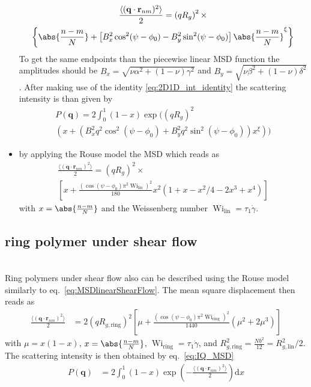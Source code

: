 \begin{itemize}
\begin{multline}
    \frac{\langle(\mathbf{q}\cdot\mathbf{r}_{nm})^2\rangle}{2} =\left(qR_g\right)^2 \times \\
    \left\{
      \abs{\frac{n-m}{N}} + \left[B_x^2\cos^2(\psi-\phi_0)-B_y^2\sin^2(\psi-\phi_0)\right]\abs{\frac{n-m}{N}}^\xi
    \right\}
    \end{multline}
    To get the same endpoints than the piecewise linear MSD function the amplitudes should be $B_x=\sqrt{\nu\alpha^2+(1-\nu)\gamma^2}$ and $B_y=\sqrt{\nu\beta^2+(1-\nu)\delta^2}$.
    After making use of the identity \ref{eq:2D1D_int_identity} the scattering intensity is than given by
    \begin{multline}
      P(\mathbf{q}) = 2 \int_0^1 (1-x) \exp\Bigg( \left(qR_g\right)^2\\
      \left(
      x + \left(B_x^2q^2\cos^2(\psi-\phi_0)+B_y^2q^2\sin^2(\psi-\phi_0)\right)x^\xi
      \right)\Bigg)
    \end{multline}
\item by applying the Rouse model \cite{Korolkovas2019} the MSD which reads as
    \begin{multline}\label{eq:MSDlinearShearFlow}
    \frac{\langle(\mathbf{q}\cdot\mathbf{r}_{nm})^2\rangle}{2} = \left(qR_g\right)^2 \times \\ \left[ x+\frac{\left(\cos(\psi-\phi_0)\pi^2\operatorname{Wi}_\mathrm{lin}\right)^2}{180} x^2\left(1+x-x^2/4-2x^3+x^4\right) \right]
    \end{multline}
    with $x=\abs{\frac{n-m}{N}}$ and the Weissenberg number $\operatorname{Wi}_\mathrm{lin}=\tau_1\dot{\gamma}$.
\end{itemize}

\subsection{ring polymer under shear flow}~\\
Ring polymers under shear flow also can be described using the Rouse model \cite{Tsolou2010,Stephanou2019} similarly to eq.\ \ref{eq:MSDlinearShearFlow}. The mean square displacement then reads as
\begin{align}\label{eq:MSDringShearFlow}
\frac{\langle(\mathbf{q}\cdot\mathbf{r}_{nm})^2\rangle}{2} &= 2\left(qR_{g,\mathrm{ring}}\right)^2
\left[ \mu+\frac{\left(\cos(\psi-\phi_0)\pi^2\operatorname{Wi}_\mathrm{ring}\right)^2}{1440} \left(\mu^2+2\mu^3\right) \right]
\end{align}
with $\mu=x(1-x)$, $x=\abs{\frac{n-m}{N}}$, $\operatorname{Wi}_\mathrm{ring}=\tau_1\dot{\gamma}$, and $R_{g,\mathrm{ring}}^2=\frac{Nb^2}{12}=R_{g,\mathrm{lin}}^2/2$. The scattering intensity is then obtained by eq.\ \ref{eq:IQ_MSD}
\begin{align}
 P(\mathbf{q}) & = 2\int_0^1 (1-x) \exp\left(-\frac{\langle(\mathbf{q}\cdot\mathbf{r}_{nm})^2\rangle}{2}\right) \mathrm{d}x
\end{align}
\newpage
